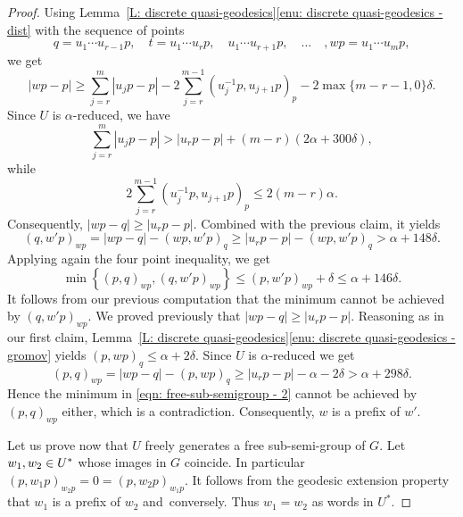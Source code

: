 \documentclass[11pt]{article}
\theoremstyle{plain}
\theoremstyle{definition}
\begin{document}
\begin{proof}
Using Lemma~\ref{L: discrete quasi-geodesics}\eqref{enu: discrete quasi-geodesics - dist} with the sequence of points
\begin{equation*}
q = u_1\cdots u_{r-1}p, \quad t = u_1\cdots u_rp, \quad u_1\cdots u_{r+1}p, \quad\dots\quad, wp = u_1\cdots u_mp,
\end{equation*}
we get
\begin{equation*}
|wp -p| \geq \sum_{j = r}^m |u_jp - p| - 2 \sum_{j = r}^{m-1} (u_j^{-1}p,u_{j+1}p)_p - 2\max\{m-r-1,0\}\delta.
\end{equation*}
Since $U$ is $\alpha$-reduced, we have
\begin{equation*}
\sum_{j = r}^m |u_jp - p| > |u_rp - p| + (m-r)(2\alpha + 300\delta),
\end{equation*}
while
\begin{equation*}
2 \sum_{j = r}^{m-1} (u_j^{-1}p,u_{j+1}p)_p \leq 2(m-r)\alpha.
\end{equation*}
Consequently, $|wp - q| \geq |u_rp - p|$.
Combined with the previous claim, it yields
\begin{equation*}
(q, w'p)_{wp} = |wp - q| - (wp,w'p)_q \geq |u_rp - p| - (wp,w'p)_q > \alpha +148\delta.
\end{equation*}
Applying again the four point inequality, we get
\begin{equation}
\label{eqn: free-sub-semigroup - 2}
\min \left\{(p,q)_{wp}, (q, w'p)_{wp}\right\} \leq (p,w'p)_{wp} + \delta \leq \alpha + 146\delta.
\end{equation}
It follows from our previous computation that the minimum cannot be achieved by $(q,w'p)_{wp}$.
We proved previously that $|wp - q| \geq |u_rp - p|$.
Reasoning as in our first claim, Lemma~\ref{L: discrete quasi-geodesics}\eqref{enu: discrete quasi-geodesics - gromov} yields $(p,wp)_q \leq \alpha + 2\delta$.
Since $U$ is $\alpha$-reduced we get
\begin{equation*}
(p,q)_{wp} = |wp-q| - (p,wp)_q \geq |u_rp - p| - \alpha - 2\delta > \alpha+298\delta.
\end{equation*}
Hence the minimum in \eqref{eqn: free-sub-semigroup - 2} cannot be achieved by $(p,q)_{wp}$ either, which is a contradiction.
Consequently, $w$ is a prefix of $w'$.

Let us prove now that $U$ freely generates a free sub-semi-group of $G$.
Let $w_1, w_2 \in\nobreak U^*$ whose images in $G$ coincide.
In particular $(p, w_1p)_{w_2p} = 0 = (p,w_2p)_{w_1p}$.
It follows from the geodesic extension property that $w_1$ is a prefix of $w_2$ and~conversely.
Thus $w_1 = w_2$ as words in $U^*$.
\end{proof}
\end{document}
